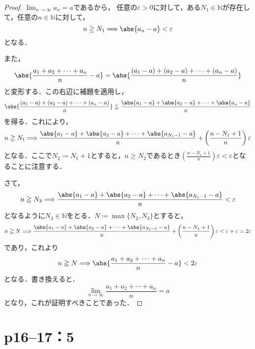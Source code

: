 \documentclass[a4paper,10pt,fleqn]{ltjsarticle}
\begin{document}
\begin{tleftbar}
    \begin{proof}
        $\lim_{n \to \infty} a_n =a$であるから，
        任意の$\varepsilon >0$に対して，ある$N_1 \in \mathbb{N}$が存在して，任意の$n \in \mathbb{N}$に対して，
        \[
            n \ge N_1 \Longrightarrow \abs{a_n -a}<\varepsilon
        \]
        となる．

        また，
        \[
            \abs{\frac{a_1+a_2+\cdots+a_n}{n}-a}= \abs{\frac{(a_1-a)+(a_2-a)+\cdots+(a_n-a)}{n}}
        \]
        と変形する．この右辺に補題を適用し，
        \[
            \abs{\frac{(a_1-a)+(a_2-a)+\cdots+(a_n-a)}{n}} \leqq \frac{\abs{a_1-a}+\abs{a_2-a}+\cdots+\abs{a_n-a}}{n}
        \]
        を得る．これにより，
        \[
            n \ge N_1 \Longrightarrow \frac{\abs{a_1-a}+\abs{a_2-a}+\cdots+\abs{a_{N_1-1}-a}}{n} +\left( \frac{n-N_1+1}{n} \right ) \varepsilon
        \]
        となる．ここで$N_2 \coloneqq N_1 +1$とすると，$n \ge N_2$であるとき$\left( \frac{n-N_1+1}{n} \right ) \varepsilon < \varepsilon$となることに注意する．

        さて，
        \[
            n \ge N_3 \Longrightarrow \frac{\abs{a_1-a}+\abs{a_2-a}+\cdots+\abs{a_{N_1-1}-a}}{n}<\varepsilon
        \]
        となるように$N_3 \in \mathbb{N}$をとる．$N \coloneqq \max \{ N_2 , N_3 \}$とすると，
        \[
            n \ge N \Longrightarrow \frac{\abs{a_1-a}+\abs{a_2-a}+\cdots+\abs{a_{N_1-1}-a}}{n} +\left( \frac{n-N_1+1}{n} \right ) \varepsilon < \varepsilon + \varepsilon = 2 \varepsilon
        \]
        であり，これより
        \[
            n \ge N \Longrightarrow \abs{\frac{a_1+a_2+\cdots+a_n}{n}-a} < 2 \varepsilon
        \]
        となる．書き換えると．
        \[
            \lim_{n \to \infty} \frac{a_1+a_2+\cdots+a_n}{n}=a
        \]
        となり，これが証明すべきことであった．
    \end{proof}
\end{tleftbar}

\newpage

\section*{p16--17：5}
\end{document}
